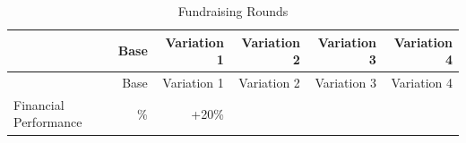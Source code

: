 \documentclass[10pt,openany]{book}
\begin{document}
\begin{longtable}[]{@{}lrrrrr@{}}
\caption{Fundraising Rounds}\tabularnewline
\toprule
\begin{minipage}[b]{0.23\columnwidth}\raggedright
\strut
\end{minipage} & \begin{minipage}[b]{0.08\columnwidth}\raggedleft
Base\strut
\end{minipage} & \begin{minipage}[b]{0.13\columnwidth}\raggedleft
Variation 1\strut
\end{minipage} & \begin{minipage}[b]{0.13\columnwidth}\raggedleft
Variation 2\strut
\end{minipage} & \begin{minipage}[b]{0.13\columnwidth}\raggedleft
Variation 3\strut
\end{minipage} & \begin{minipage}[b]{0.13\columnwidth}\raggedleft
Variation 4\strut
\end{minipage}\tabularnewline
\midrule
\endfirsthead
\toprule
\begin{minipage}[b]{0.23\columnwidth}\raggedright
\strut
\end{minipage} & \begin{minipage}[b]{0.08\columnwidth}\raggedleft
Base\strut
\end{minipage} & \begin{minipage}[b]{0.13\columnwidth}\raggedleft
Variation 1\strut
\end{minipage} & \begin{minipage}[b]{0.13\columnwidth}\raggedleft
Variation 2\strut
\end{minipage} & \begin{minipage}[b]{0.13\columnwidth}\raggedleft
Variation 3\strut
\end{minipage} & \begin{minipage}[b]{0.13\columnwidth}\raggedleft
Variation 4\strut
\end{minipage}\tabularnewline
\midrule
\endhead
\begin{minipage}[t]{0.23\columnwidth}\raggedright
Financial Performance\strut
\end{minipage} & \begin{minipage}[t]{0.08\columnwidth}\raggedleft
0\%\strut
\end{minipage} & \begin{minipage}[t]{0.13\columnwidth}\raggedleft
+20\%\strut
\end{minipage} & \begin{minipage}[t]{0.13\columnwidth}\raggedleft

\end{minipage}
\end{longtable}
\end{document}
